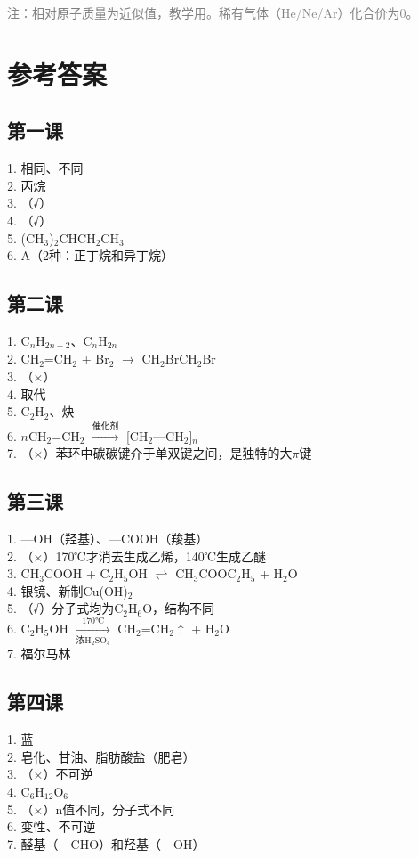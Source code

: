 \documentclass[a4paper,12pt]{ctexart}
\begin{document}
\vspace{0.3cm}
\textcolor{gray}{\small 注：相对原子质量为近似值，教学用。稀有气体（He/Ne/Ar）化合价为0。}

\newpage
\section*{\textcolor{defblue}{参考答案}}

\subsection*{第一课}
1. 相同、不同\\
2. 丙烷\\
3. （√）\\
4. （√）\\
5. (CH$_3$)$_2$CHCH$_2$CH$_3$\\
6. A（2种：正丁烷和异丁烷）

\subsection*{第二课}
1. C$_n$H$_{2n+2}$、C$_n$H$_{2n}$\\
2. CH$_2$=CH$_2$ + Br$_2$ $\rightarrow$ CH$_2$BrCH$_2$Br\\
3. （×）\\
4. 取代\\
5. C$_2$H$_2$、炔\\
6. $n$CH$_2$=CH$_2$ $\xrightarrow{\text{催化剂}}$ [CH$_2$—CH$_2$]$_n$\\
7. （×）苯环中碳碳键介于单双键之间，是独特的大$\pi$键

\subsection*{第三课}
1. —OH（羟基）、—COOH（羧基）\\
2. （×）170℃才消去生成乙烯，140℃生成乙醚\\
3. CH$_3$COOH + C$_2$H$_5$OH $\rightleftharpoons$ CH$_3$COOC$_2$H$_5$ + H$_2$O\\
4. 银镜、新制Cu(OH)$_2$\\
5. （√）分子式均为C$_2$H$_6$O，结构不同\\
6. C$_2$H$_5$OH $\xrightarrow[\text{浓H$_2$SO$_4$}]{170℃}$ CH$_2$=CH$_2$$\uparrow$ + H$_2$O\\
7. 福尔马林

\subsection*{第四课}
1. 蓝\\
2. 皂化、甘油、脂肪酸盐（肥皂）\\
3. （×）不可逆\\
4. C$_6$H$_{12}$O$_6$\\
5. （×）n值不同，分子式不同\\
6. 变性、不可逆\\
7. 醛基（—CHO）和羟基（—OH）
\end{document}
